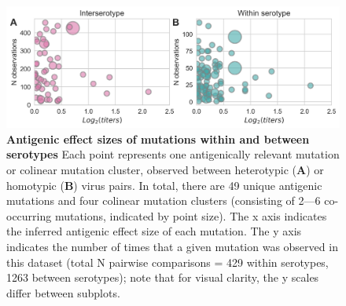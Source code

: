 \documentclass[11pt,oneside,letterpaper]{article}
\begin{document}
\begin{figure}[ht]
  \begin{centering}
  \includegraphics[width=\textwidth]{../figures/png/mutations_db_N.png}
  	\caption{\textbf{Antigenic effect sizes of mutations within and between serotypes}
    Each point represents one antigenically relevant mutation or colinear mutation cluster, observed between heterotypic (\textbf{A}) or homotypic (\textbf{B}) virus pairs.
    In total, there are 49 unique antigenic mutations and four colinear mutation clusters (consisting of 2---6 co-occurring mutations, indicated by point size).
    The x axis indicates the inferred antigenic effect size of each mutation.
    The y axis indicates the number of times that a given mutation was observed in this dataset (total N pairwise comparisons = 429 within serotypes, 1263 between serotypes); note that for visual clarity, the y scales differ between subplots.}
  	\label{mutations_db}
  \end{centering}
\end{figure}
\end{document}
